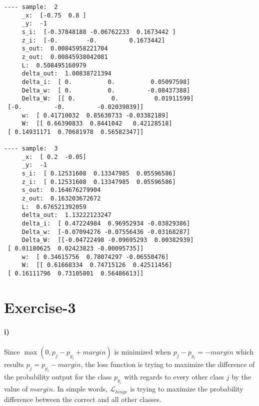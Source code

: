 \documentclass[10pt]{article}
\begin{document}
\begin{multicols}{3}
\begin{tiny}
\begin{verbatim}
---- sample:  2
     _x:  [-0.75  0.8 ]
     _y:  -1
     s_i:  [-0.37848188 -0.06762233  0.1673442 ]
     z_i:  [-0.        -0.         0.1673442]
     s_out:  0.00845958221704
     z_out:  0.00845938042081
     L:  0.508495160979
     delta_out:  1.00838721394
     delta_i:  [ 0.          0.          0.05097598]
     Delta_w:  [ 0.          0.         -0.08437388]
     Delta_W:  [[ 0.          0.          0.01911599]
 [-0.         -0.         -0.02039039]]
     w:  [ 0.41710032  0.85630733 -0.03382189]
     W:  [[ 0.66390833  0.8441042   0.42128518]
 [ 0.14931171  0.70681978  0.56582347]]

---- sample:  3
     _x:  [ 0.2  -0.05]
     _y:  -1
     s_i:  [ 0.12531608  0.13347985  0.05596586]
     z_i:  [ 0.12531608  0.13347985  0.05596586]
     s_out:  0.164676279904
     z_out:  0.163203672672
     L:  0.676521392059
     delta_out:  1.13222123247
     delta_i:  [ 0.47224984  0.96952934 -0.03829386]
     Delta_w:  [-0.07094276 -0.07556436 -0.03168287]
     Delta_W:  [[-0.04722498 -0.09695293  0.00382939]
 [ 0.01180625  0.02423823 -0.00095735]]
     w:  [ 0.34615756  0.78074297 -0.06550476]
     W:  [[ 0.61668334  0.74715126  0.42511456]
 [ 0.16111796  0.73105801  0.56486613]]
\end{verbatim}
\end{tiny}
\end{multicols}

\section*{Exercise-3}
\paragraph{i)}Since $\max(0, p_j - p_{y_i} + margin)$ is minimized when $p_j - p_{y_i} = - margin$ which results $p_j = p_{y_i} - margin$, the loss function is trying to maximize the difference of the probability output for the class $p_{y_i}$ with regards to every other class $j$ by the value of $margin$.
In simple words, $\mathcal{L}_{hinge}$ is trying to maximize the probability difference between the correct and all other classes.
\end{document}
